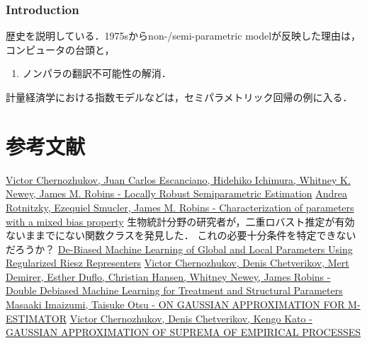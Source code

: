 \documentclass[uplatex,dvipdfmx]{jsreport}
\begin{document}
\subsection{Introduction}

\begin{tcolorbox}[colframe=ForestGreen, colback=ForestGreen!10!white,breakable,colbacktitle=ForestGreen!40!white,coltitle=black,fonttitle=\bfseries\sffamily,
title=]
    歴史を説明している．1975sからnon-/semi-parametric modelが反映した理由は，コンピュータの台頭と，
\end{tcolorbox}

\begin{enumerate}
    \item ノンパラの翻訳不可能性の解消．
\end{enumerate}

\begin{example}
    計量経済学における指数モデルなどは，セミパラメトリック回帰の例に入る．
\end{example}

\chapter{参考文献}

\begin{thebibliography}{99}
    \href{https://arxiv.org/abs/1608.00033}{Victor Chernozhukov, Juan Carlos Escanciano, Hidehiko Ichimura, Whitney K. Newey, James M. Robins - Locally Robust Semiparametric Estimation}
    \href{https://arxiv.org/abs/1904.03725}{Andrea Rotnitzky, Ezequiel Smucler, James M. Robins - Characterization of parameters with a mixed bias property}
    生物統計分野の研究者が，二重ロバスト推定が有効ないままでにない関数クラスを発見した．
    これの必要十分条件を特定できないだろうか？
    \href{https://arxiv.org/abs/1802.08667}{De-Biased Machine Learning of Global and Local Parameters Using Regularized Riesz Representers}
    \href{https://arxiv.org/abs/1608.00060}{Victor Chernozhukov, Denis Chetverikov, Mert Demirer, Esther Duflo, Christian Hansen, Whitney Newey, James Robins - Double Debiased Machine Learning for Treatment and Structural Parameters}
    \href{https://arxiv.org/abs/2012.15678}{Masaaki Imaizumi, Taisuke Otsu - ON GAUSSIAN APPROXIMATION FOR M-ESTIMATOR}
    \href{https://arxiv.org/abs/1212.6885}{Victor Chernozhukov, Denis Chetverikov, Kengo Kato - GAUSSIAN APPROXIMATION OF SUPREMA OF EMPIRICAL PROCESSES}
\end{thebibliography}
\end{document}
